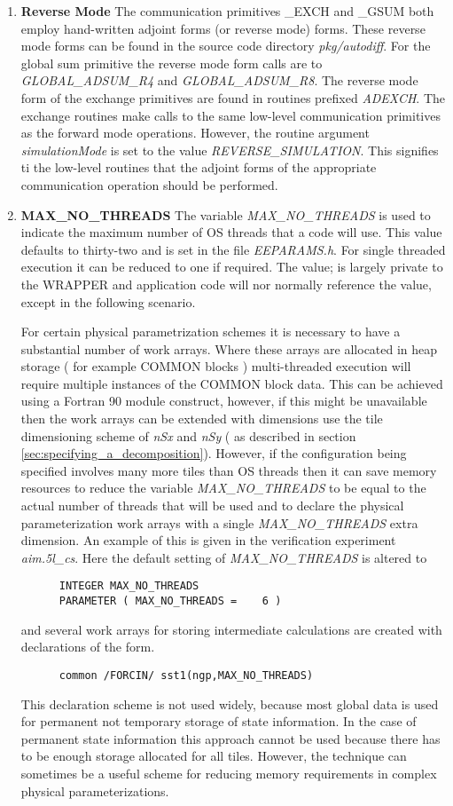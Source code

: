 \begin{enumerate}
\item {\bf Reverse Mode}
The communication primitives \_EXCH and \_GSUM both employ 
hand-written adjoint forms (or reverse mode) forms. 
These reverse mode forms can be found in the
source code directory {\em pkg/autodiff}.
For the global sum primitive the reverse mode form
calls are to {\em GLOBAL\_ADSUM\_R4} and
{\em GLOBAL\_ADSUM\_R8}. The reverse mode form of the
exchange primitives are found in routines
prefixed {\em ADEXCH}. The exchange routines make calls to
the same low-level communication primitives as the forward mode
operations. However, the routine argument {\em simulationMode}
is set to the value {\em REVERSE\_SIMULATION}. This signifies 
ti the low-level routines that the adjoint forms of the
appropriate communication operation should be performed.
\item {\bf MAX\_NO\_THREADS}
The variable {\em MAX\_NO\_THREADS} is used to indicate the
maximum number of OS threads that a code will use. This
value defaults to thirty-two and is set in the file {\em EEPARAMS.h}.
For single threaded execution it can be reduced to one if required.
The value; is largely private to the WRAPPER and application code
will nor normally reference the value, except in the following scenario.

For certain physical parametrization schemes it is necessary to have 
a substantial number of work arrays. Where these arrays are allocated
in heap storage ( for example COMMON blocks ) multi-threaded
execution will require multiple instances of the COMMON block data.
This can be achieved using a Fortran 90 module construct, however,
if this might be unavailable then the work arrays can be extended
with dimensions use the tile dimensioning scheme of {\em nSx}
and {\em nSy} ( as described in section 
\ref{sec:specifying_a_decomposition}). However, if the configuration
being specified involves many more tiles than OS threads then
it can save memory resources to reduce the variable
{\em MAX\_NO\_THREADS} to be equal to the actual number of threads that
will be used and to declare the physical parameterization
work arrays with a single {\em MAX\_NO\_THREADS} extra dimension.
An example of this is given in the verification experiment
{\em aim.5l\_cs}. Here the default setting of 
{\em MAX\_NO\_THREADS} is altered to
\begin{verbatim}
      INTEGER MAX_NO_THREADS
      PARAMETER ( MAX_NO_THREADS =    6 )
\end{verbatim}
and several work arrays for storing intermediate calculations are
created with declarations of the form.
\begin{verbatim}
      common /FORCIN/ sst1(ngp,MAX_NO_THREADS)
\end{verbatim}
This declaration scheme is not used widely, because most global data
is used for permanent not temporary storage of state information.
In the case of permanent state information this approach cannot be used
because there has to be enough storage allocated for all tiles.
However, the technique can sometimes be a useful scheme for reducing memory 
requirements in complex physical parameterizations.
\end{enumerate}

